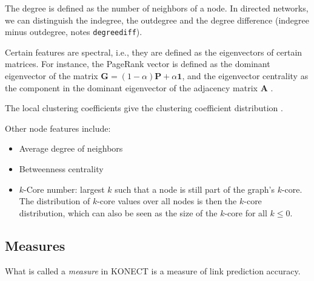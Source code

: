 \documentclass{article}
\begin{document}
The degree is defined as the number 
of neighbors of a node.  In directed networks, we can distinguish the
indegree, the outdegree and the degree difference (indegree minus
outdegree, notes \texttt{degreediff}). 

Certain features are spectral, i.e., they are defined as the
eigenvectors of certain matrices.  For instance, the PageRank vector
 is defined as the dominant eigenvector of
the matrix $\mathbf G = (1-\alpha) \mathbf P + \alpha\mathbf 1$, and the
eigenvector centrality as the component in the dominant eigenvector of
the adjacency matrix $\mathbf A$ \citep{todo-from-book}. 

The local clustering coefficients give the clustering coefficient
distribution  \citep{b865}. 

Other node features include:
\begin{itemize}
\item Average degree of neighbors
\item Betweenness centrality
\item $k$-Core number:  largest $k$ such that a node is still part of
  the graph's $k$-core.  The distribution of $k$-core values over all
  nodes is then the $k$-core distribution, which can also be seen as the
  size of the $k$-core for all $k \leq 0$. 
\end{itemize}

\subsection{Measures}
What is called a \emph{measure} in KONECT is a measure of link
prediction accuracy. 
\end{document}
